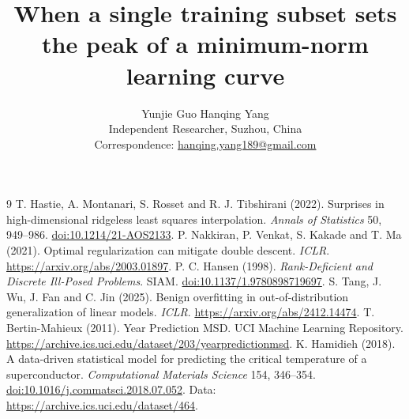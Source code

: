 \documentclass[11pt]{article}
\title{When a single training subset sets the peak of a minimum-norm learning curve}
\author{Yunjie Guo \qquad Hanqing Yang\\[2pt]
\small Independent Researcher, Suzhou, China\\
\small Correspondence: \href{mailto:hanqing.yang189@gmail.com}{hanqing.yang189@gmail.com}}
\date{}
\begin{document}
\maketitle
\begin{abstract}

\end{abstract}



\begin{thebibliography}{9}\small
{} T. Hastie, A. Montanari, S. Rosset and R. J. Tibshirani (2022). Surprises in high-dimensional ridgeless least squares interpolation. \emph{Annals of Statistics} 50, 949--986. \href{https://doi.org/10.1214/21-AOS2133}{doi:10.1214/21-AOS2133}.
 P. Nakkiran, P. Venkat, S. Kakade and T. Ma (2021). Optimal regularization can mitigate double descent. \emph{ICLR}. \url{https://arxiv.org/abs/2003.01897}.
 P. C. Hansen (1998). \emph{Rank-Deficient and Discrete Ill-Posed Problems}. SIAM. \href{https://doi.org/10.1137/1.9780898719697}{doi:10.1137/1.9780898719697}.
 S. Tang, J. Wu, J. Fan and C. Jin (2025). Benign overfitting in out-of-distribution generalization of linear models. \emph{ICLR}. \url{https://arxiv.org/abs/2412.14474}.
 T. Bertin-Mahieux (2011). Year Prediction MSD. UCI Machine Learning Repository. \url{https://archive.ics.uci.edu/dataset/203/yearpredictionmsd}.
 K. Hamidieh (2018). A data-driven statistical model for predicting the critical temperature of a superconductor. \emph{Computational Materials Science} 154, 346--354. \href{https://doi.org/10.1016/j.commatsci.2018.07.052}{doi:10.1016/j.commatsci.2018.07.052}. Data: \url{https://archive.ics.uci.edu/dataset/464}.
\end{thebibliography}


\end{document}
